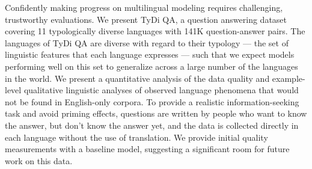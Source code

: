 Confidently making progress on multilingual modeling requires challenging, trustworthy evaluations. We present TyDi QA, a question answering dataset covering 11 typologically diverse languages with 141K question-answer pairs.  The languages of TyDi QA are diverse with regard to their typology --- the set of linguistic features that each language expresses --- such that we expect models performing well on this set to generalize across a large number of the languages in the world. We present a quantitative analysis of the data quality and example-level qualitative linguistic analyses of observed language phenomena that would not be found in English-only corpora. To provide a realistic information-seeking task and avoid priming effects, questions are written by people who want to know the answer, but don't know the answer yet, and the data is collected directly in each language without the use of translation. We provide initial quality measurements with a baseline model, suggesting a significant room for future work on this data.